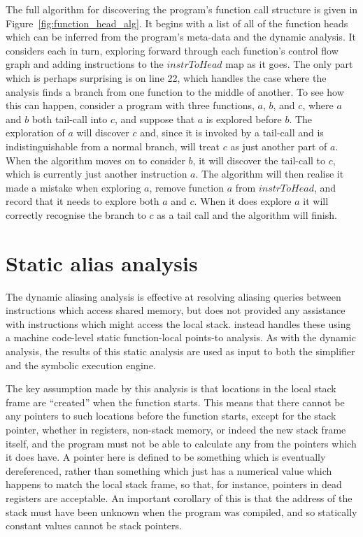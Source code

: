 The full algorithm for discovering the program's function call
structure is given in Figure~\ref{fig:function_head_alg}.  It begins
with a list of all of the function heads which can be inferred from
the program's meta-data and the dynamic analysis.  It considers each
in turn, exploring forward through each function's control flow graph
and adding instructions to the $\mathit{instrToHead}$ map as it goes.
The only part which is perhaps surprising is on line 22, which handles
the case where the analysis finds a branch from one function to the
middle of another.  To see how this can happen, consider a program
with three functions, $a$, $b$, and $c$, where $a$ and $b$ both
tail-call into $c$, and suppose that $a$ is explored before $b$.  The
exploration of $a$ will discover $c$ and, since it is invoked by a
tail-call and is indistinguishable from a normal branch, will treat
$c$ as just another part of $a$.  When the algorithm moves on to
consider $b$, it will discover the tail-call to $c$, which is
currently just another instruction $a$.  The algorithm will then
realise it made a mistake when exploring $a$, remove function $a$ from
$\mathit{instrToHead}$, and record that it needs to explore both $a$
and $c$.  When it does explore $a$ it will correctly recognise the
branch to $c$ as a tail call and the algorithm will finish.

\section{Static alias analysis}
\label{sect:program_model:static_aliasing}


The dynamic aliasing analysis is effective at resolving aliasing
queries between instructions which access shared memory, but does not
provided any assistance with instructions which might access the local
stack.  {\Technique} instead handles these using a machine code-level
static function-local points-to analysis.  As with the dynamic
analysis, the results of this static analysis are used as input to
both the {\StateMachine} simplifier and the symbolic execution engine.

The key assumption made by this analysis is that locations in the
local stack frame are ``created'' when the function starts.  This
means that there cannot be any pointers to such locations before the
function starts, except for the stack pointer, whether in registers,
non-stack memory, or indeed the new stack frame itself, and the
program must not be able to calculate any from the pointers which it
does have.  A pointer here is defined to be something which is
eventually dereferenced, rather than something which just has a
numerical value which happens to match the local stack frame, so that,
for instance, pointers in dead registers are acceptable.  An important
corollary of this is that the address of the stack must have been
unknown when the program was compiled, and so statically constant
values cannot be stack pointers.

